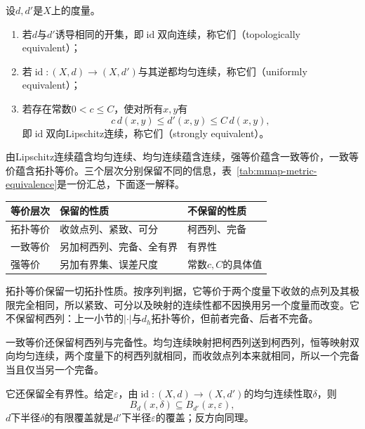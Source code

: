 \begin{definition}[度量的三种等价]
\label{def:mmap-metric-equivalence}
设$d,d'$是$X$上的度量。
\begin{enumerate}
\item 若$d$与$d'$诱导相同的开集，即$\operatorname{id}$双向连续，称它们（topologically equivalent）；
\item 若$\operatorname{id}:(X,d)\to(X,d')$与其逆都均匀连续，称它们（uniformly equivalent）；
\item 若存在常数$0<c\leq C$，使对所有$x,y$有
\begin{equation}
 c\,d(x,y)\leq d'(x,y)\leq C\,d(x,y),
 \label{eq:mmap-strong-equivalence}
\end{equation}
即$\operatorname{id}$双向Lipschitz连续，称它们（strongly equivalent）。
\end{enumerate}
\end{definition}

由Lipschitz连续蕴含均匀连续、均匀连续蕴含连续，强等价蕴含一致等价，一致等价蕴含拓扑等价。三个层次分别保留不同的信息，表~\ref{tab:mmap-metric-equivalence}是一份汇总，下面逐一解释。

\begin{BookInlineTable}
  \centering
  \caption{同一集合上三种度量等价保留的信息}
  \label{tab:mmap-metric-equivalence}
  \begin{tabular}{lll}
    \toprule
    等价层次 & 保留的性质 & 不保留的性质 \\
    \midrule
    拓扑等价 & 收敛点列、紧致、可分 & 柯西列、完备 \\
    一致等价 & 另加柯西列、完备、全有界 & 有界性 \\
    强等价 & 另加有界集、误差尺度 & 常数$c,C$的具体值 \\
    \bottomrule
  \end{tabular}
\end{BookInlineTable}

拓扑等价保留一切拓扑性质。按序列判据，它等价于两个度量下收敛的点列及其极限完全相同，所以紧致、可分以及映射的连续性都不因换用另一个度量而改变。它不保留柯西列：上一小节的$\lvert\cdot\rvert$与$d_h$拓扑等价，但前者完备、后者不完备。

一致等价还保留柯西列与完备性。均匀连续映射把柯西列送到柯西列，恒等映射双向均匀连续，两个度量下的柯西列就相同，而收敛点列本来就相同，所以一个完备当且仅当另一个完备。

它还保留全有界性。给定$\varepsilon$，由$\operatorname{id}:(X,d)\to(X,d')$的均匀连续性取$\delta$，则
\[
 B_d(x,\delta)\subseteq B_{d'}(x,\varepsilon),
\]
$d$下半径$\delta$的有限覆盖就是$d'$下半径$\varepsilon$的覆盖；反方向同理。

